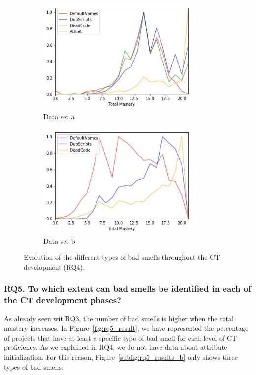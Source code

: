 \begin{figure}
    \begin{subfigure}{.5\textwidth}
    \centering
    \includegraphics[width=8cm]{img/rq4_dataset_a.png}
    \caption{Data set a}
    \label{subfig:rq4_results_a}
  \end{subfigure}
  \begin{subfigure}{.5\textwidth}
    \centering
    \includegraphics[width=8cm]{img/rq4_dataset_b.png}
    \caption{Data set b}
    \label{subfig:rq4_results_b}
  \end{subfigure}
    \caption{Evolution of the different types of bad smells throughout the CT development (RQ4).}
    \label{fig:rq4_result}
\end{figure}


\subsubsection{RQ5. To which extent can bad smells be identified in each of the CT development phases?}
\label{subsubsec:rq5_results}

As already seen wit RQ3, the number of bad smells is higher when the total mastery increases. In Figure~\ref{fig:rq5_result}, we have represented the percentage of projects that have at least a specific type of bad smell for each level of CT proficiency. As we explained in RQ4, we do not have data about attribute initialization. For this reason, Figure~\ref{subfig:rq5_results_b} only shows three types of bad smells.

